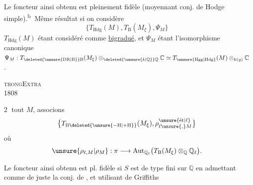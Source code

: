 Le foncteur  ainsi obtenu est pleinement fidèle (moyennant conj. de Hodge simple).\textsuperscript{\textcircled{b}} Même résultat si on considère
\[
\bigl\{T_{\mathrm{Hdg}}(M),T_{\mathrm B}(M_\xi),\Psi_M\bigr\}
\]
$T_{\mathrm{Hdg}}(M)$ étant considéré comme \uline{bigradué}, et $\Psi_M$ étant l'isomorphisme canonique $\Psi_M:T_{\deleted{\unsure{\mathrm{DR}|\mathrm B}}\mathrm B}(M_\xi)\otimes_{\deleted{\unsure{k|\mathbb Q}}\mathbb Q}\mathbb C\simeq T_{\unsure{\mathrm{Hgg}|\mathrm{Hdg}}}(M)\otimes_{k(y)}\mathbb C$.
\par\noindent\textsc{trong}\hfill\textsc{Extra}\\
 1808\hfill{}

\textcircled{2}    tout $M$, associons
\[
\bigl\{T_{\mathrm B\deleted{\unsure{-\mathrm H|+\mathrm H}}}(M_\xi),\rho_{\ell\unsure{,}M}^{\unsure{\text{ét}|\ell}}\bigr\}
\]
  où
\[
\unsure{\rho_{\ell,M}|\rho_M}:\pi\longrightarrow\operatorname{Aut}_{\mathbb Q_\ell}\bigl(T_{\mathrm B}(M_\xi)\otimes_{\mathbb Q}\mathbb Q_\ell\bigr).
\]

Le foncteur ainsi obtenu est pl. fidèle si $S$ est  de type fini sur $\mathbb Q$ \unsure{,} en admettant comme de juste la conj. de , et utilisant  de Griffiths


